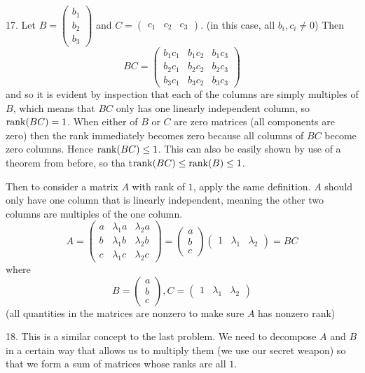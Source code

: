 \documentclass[11pt]{article}
\begin{document}
17. Let $B = \begin{pmatrix}
    b_1\\b_2\\b_3
\end{pmatrix}$ and $C = \begin{pmatrix}
    c_1 & c_2 & c_3
\end{pmatrix}$. (in this case, all $b_i,c_i\neq 0$) Then $$BC = \begin{pmatrix}
    b_1c_1 & b_1c_2 & b_1c_3 \\
    b_2c_1 & b_2c_2 & b_2c_3 \\
    b_3c_1 & b_3c_2 & b_3c_3
\end{pmatrix}$$ and so it is evident by inspection that each of the columns are simply multiples of $B$, which means that $BC$ only has one linearly independent column, so $\rank(BC) = 1$. When either of $B$ or $C$ are zero matrices (all components are zero) then the rank immediately becomes zero because all columns of $BC$ become zero columns. Hence $\rank(BC)\leq 1$. This can also be easily shown by use of a theorem from before, so tha t$\rank(BC)\leq \rank(B) \leq 1$. 

Then to consider a matrix $A$ with rank of $1$, apply the same definition. $A$ should only have one column that is linearly independent, meaning the other two columns are multiples of the one column. $$A = \begin{pmatrix}
    a & \lambda_1 a & \lambda_2 a \\
    b & \lambda_1 b & \lambda_2 b \\
    c & \lambda_1 c & \lambda_2 c
\end{pmatrix} = \begin{pmatrix}
    a \\ b\\ c
\end{pmatrix}\begin{pmatrix}
    1 & \lambda_1 & \lambda_2
\end{pmatrix} = BC$$ where $$B = \begin{pmatrix}
    a \\ b\\ c
\end{pmatrix}, C = \begin{pmatrix}
1 & \lambda_1 & \lambda_2
\end{pmatrix}$$ (all quantities in the matrices are nonzero to make sure $A$ has nonzero rank)

18. This is a similar concept to the last problem. We need to decompose $A$ and $B$ in a certain way that allows us to multiply them (we use our secret weapon) so that we form a sum of matrices whose ranks are all $1$.
\end{document}
